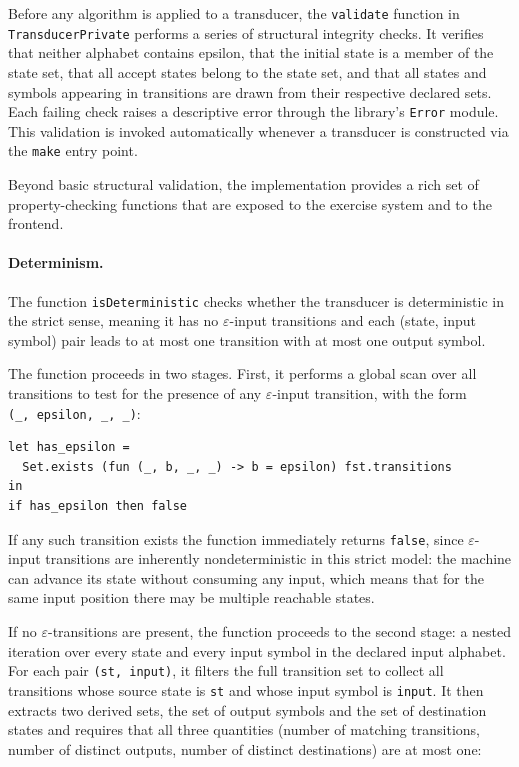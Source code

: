 Before any algorithm is applied to a transducer, the \texttt{validate} function in \texttt{TransducerPrivate} performs a series 
of structural integrity checks. It verifies that neither alphabet contains epsilon, that the initial state is a member of the 
state set, that all accept states belong to the state set, and that all states and symbols appearing in transitions are drawn 
from their respective declared sets. Each failing check raises a descriptive error through the library's \texttt{Error} module. 
This validation is invoked automatically whenever a transducer is constructed via the \texttt{make} entry point.

Beyond basic structural validation, the implementation provides a rich set of property-checking functions that are exposed to the 
exercise system and to the frontend.

\paragraph{Determinism.}
The function \texttt{isDeterministic} checks whether the transducer is deterministic in the strict sense,
meaning it has no $\varepsilon$-input transitions and each (state, input symbol) pair leads to at most one transition 
with at most one output symbol.

The function proceeds in two stages. First, it performs a global scan over all transitions to test for the presence 
of any $\varepsilon$-input transition, with the form \texttt{(\_,~epsilon,~\_,~\_)}:

\begin{verbatim}
let has_epsilon =
  Set.exists (fun (_, b, _, _) -> b = epsilon) fst.transitions
in
if has_epsilon then false
\end{verbatim}

If any such transition exists the function immediately returns \texttt{false}, since $\varepsilon$-input transitions 
are inherently nondeterministic in this strict model: the machine can advance its state without consuming any input, 
which means that for the same input position there may be multiple reachable states.

If no $\varepsilon$-transitions are present, the function proceeds to the second stage: a nested iteration over every 
state and every input symbol in the declared input alphabet. For each pair \texttt{(st, input)}, it filters the 
full transition set to collect all transitions whose source state is \texttt{st} and whose input symbol is 
\texttt{input}. It then extracts two derived sets, the set of output symbols and the set of destination states 
and requires that all three quantities (number of matching transitions, number of distinct outputs, number of 
distinct destinations) are at most one:

